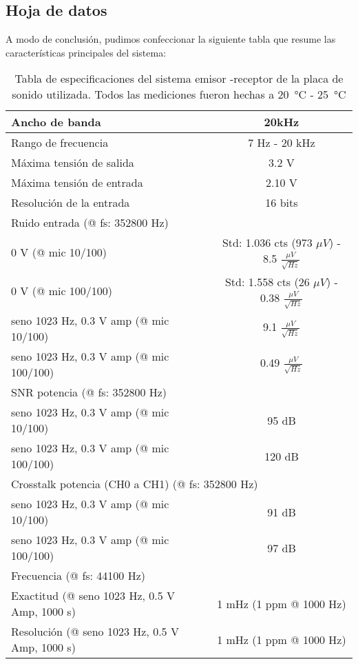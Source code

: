 \documentclass[a4paper, 11pt]{article}
\begin{document}
\subsection*{Hoja de datos}
A modo de conclusión, pudimos confeccionar la siguiente tabla que resume las características principales del sistema:
\begin {table}[H]
\begin {center}
 \begin{tabular} {|l|c|}
        \hline
        Ancho de banda & 20kHz \\
        \hline
        Rango de frecuencia & 7 Hz - 20 kHz\\
        \hline
        Máxima tensión de salida  & 3.2 V\\
        \hline
        Máxima tensión de entrada  & 2.10 V\\
        \hline
        Resolución de la entrada  & 16 bits\\
        \hline
	\multicolumn{2}{|l|}{Ruido entrada (@ fs: 352800 Hz)} \tabularnewline
        \hline
        0 V (@ mic 10/100) & Std: 1.036 cts (973 $\mu V$)  - 8.5 $ \frac{\mu V}{\sqrt{Hz}}$ \\
        0 V (@ mic 100/100) & Std: 1.558 cts (26 $\mu V$) - 0.38 $ \frac{\mu V}{\sqrt{Hz}}$ \\
        \hline
         seno 1023 Hz, 0.3 V amp (@ mic 10/100) & 9.1 $ \frac{\mu V}{\sqrt{Hz}}$\\
	seno 1023 Hz, 0.3 V amp (@ mic 100/100) & 0.49 $ \frac{\mu V}{\sqrt{Hz}}$\\
        \hline
	\multicolumn{2}{|l|}{SNR potencia (@ fs: 352800 Hz)} \tabularnewline
        \hline
         seno 1023 Hz, 0.3 V amp (@ mic 10/100) & 95 dB \\
	seno 1023 Hz, 0.3 V amp (@ mic 100/100) & 120 dB \\
	\hline
	\multicolumn{2}{|l|}{Crosstalk potencia (CH0 a CH1) (@ fs: 352800 Hz)} \tabularnewline
	\hline
        seno 1023 Hz, 0.3 V amp (@ mic 10/100) & 91 dB \\
	seno 1023 Hz, 0.3 V amp (@ mic 100/100) & 97 dB \\
        \hline
\multicolumn{2}{|l|}{Frecuencia (@ fs: 44100 Hz) } \tabularnewline
        \hline
	Exactitud (@ seno 1023 Hz, 0.5 V Amp, 1000 s)  & 1 mHz (1 ppm @ 1000 Hz) \\
	Resolución (@ seno 1023 Hz, 0.5 V Amp, 1000 s) & 1 mHz (1 ppm @ 1000 Hz) \\
        \hline
 \end{tabular}
 \caption{Tabla de especificaciones del sistema emisor -receptor de la placa de sonido utilizada. Todos las mediciones fueron hechas a \SI{20}{\celsius} - \SI{25}{\celsius}}
 \label{table1}
 \end{center}
\end{table}
\end{document}

